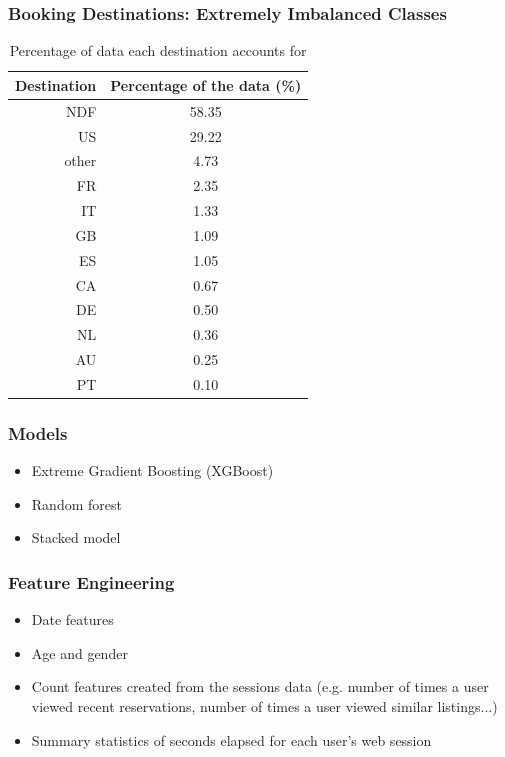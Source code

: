 \documentclass{beamer}
\begin{document}
\begin{frame}
\frametitle{Booking Destinations: Extremely Imbalanced Classes}
\begin{table}[ht]
\centering
\begin{tabular}{| r |c |}
  \hline
  \textbf{Destination} & \textbf{Percentage of the data (\%)} \\ 
  \hline
  NDF & 58.35 \\ 
  US & 29.22 \\ 
  other & 4.73 \\ 
  FR & 2.35 \\ 
  IT & 1.33 \\ 
  GB & 1.09 \\ 
  ES & 1.05 \\ 
  CA & 0.67 \\ 
  DE & 0.50 \\ 
  NL & 0.36 \\ 
  AU & 0.25 \\ 
  PT & 0.10 \\ 
   \hline
\end{tabular}
\caption{Percentage of data each destination accounts for}
\label{table:countries}
\end{table}
\end{frame}


\begin{frame}
\frametitle{Models}
  \begin{itemize}
    \item Extreme Gradient Boosting (XGBoost)
    \item Random forest
    \item Stacked model
  \end{itemize}
\end{frame}


\begin{frame}
\frametitle{Feature Engineering}
\begin{itemize}
  \item Date features
  \item Age and gender
  \item Count features created from the sessions data (e.g. number of times a user viewed recent reservations, number of times a user viewed similar listings...)
  \item Summary statistics of seconds elapsed for each user’s web session
\end{itemize}
\end{frame}
\end{document}
